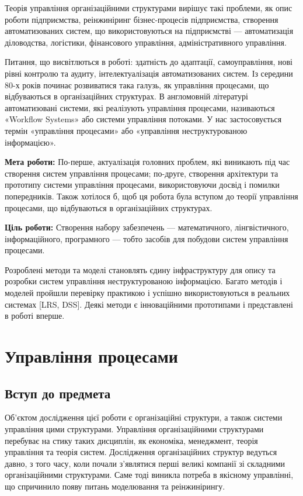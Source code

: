 \documentclass{memoir}
\begin{document}
Теорія управління організаційними структурами вирішує такі проблеми,
як опис роботи підприємства, реінжиніринг бізнес-процесів підприємства,
створення автоматизованих систем, що використовуються на підприємстві — автоматизація
діловодства, логістики, фінансового управління, адміністративного управління.

Питання, що висвітлються в роботі: здатність до адаптації, самоуправління,
нові рівні контролю та аудиту, інтелектуалізація автоматизованих систем.
Із середини 80-х років починає розвиватися така галузь, як управління процесами,
що відбуваються в організаційних структурах. В англомовній літературі автоматизовані
системи, які реалізують управління процесами, називаються «Workflow Systems» або
системи управління потоками. У нас застосовується термін «управління процесами»
або «управління неструктурованою інформацією».

\textbf{Мета роботи:} По-перше, актуалізація головних проблем,
які виникають під час створення систем управління процесами; по-друге, створення
архітектури та прототипу системи управління процесами, використовуючи досвід і
помилки попередників. Також хотілося б, щоб ця робота була вступом до теорії
управління процесами, що відбуваються в організаційних структурах.

\textbf{Ціль роботи:} Створення набору забезпечень — математичного, лінгвістичного,
інформаційного, програмного — тобто засобів для побудови систем управління процесами.

Розроблені методи та моделі становлять єдину інфраструктуру для опису та розробки
систем управління неструктурованою інформацією. Багато методів і моделей пройшли
перевірку практикою і успішно використовуються в реальних системах [LRS, DSS].
Деякі методи є інноваційними прототипами і представлені в роботі вперше.

\chapter{Управління процесами}

\section{Вступ до предмета}

Об’єктом дослідження цієї роботи є організаційні структури, а також системи управління цими структурами. Управління організаційними структурами перебуває на стику таких дисциплін, як економіка, менеджмент, теорія управління та теорія систем. Дослідження організаційних структур ведуться давно, з того часу, коли почали з’являтися перші великі компанії зі складними організаційними структурами. Саме тоді виникла потреба в якісному управлінні, що спричинило появу питань моделювання та реінжинірингу.
\end{document}
